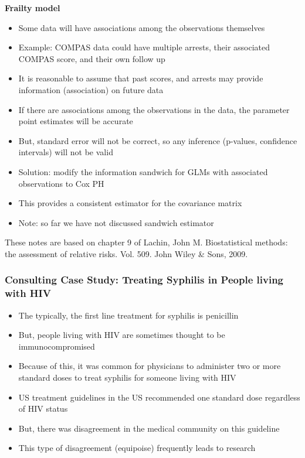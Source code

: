 \documentclass[
]{article}
\providecommand{\tightlist}{%
  \setlength{\itemsep}{0pt}\setlength{\parskip}{0pt}}
\begin{document}
\textbf{Frailty model}

\begin{itemize}
\tightlist
\item
  Some data will have associations among the observations themselves
\item
  Example: COMPAS data could have multiple arrests, their associated
  COMPAS score, and their own follow up
\item
  It is reasonable to assume that past scores, and arrests may provide
  information (association) on future data
\item
  If there are associations among the observations in the data, the
  parameter point estimates will be accurate
\item
  But, standard error will not be correct, so any inference (p-values,
  confidence intervals) will not be valid
\item
  Solution: modify the information sandwich for GLMs with associated
  observations to Cox PH
\item
  This provides a consistent estimator for the covariance matrix
\item
  Note: so far we have not discussed sandwich estimator
\end{itemize}

These notes are based on chapter 9 of Lachin, John M. Biostatistical
methods: the assessment of relative risks. Vol. 509. John Wiley \& Sons,
2009.

\hypertarget{consulting-case-study-treating-syphilis-in-people-living-with-hiv}{%
\subsubsection{Consulting Case Study: Treating Syphilis in People living
with
HIV}\label{consulting-case-study-treating-syphilis-in-people-living-with-hiv}}

\begin{itemize}
\tightlist
\item
  The typically, the first line treatment for syphilis is penicillin
\item
  But, people living with HIV are sometimes thought to be
  immunocompromised
\item
  Because of this, it was common for physicians to administer two or
  more standard doses to treat syphilis for someone living with HIV
\item
  US treatment guidelines in the US recommended one standard dose
  regardless of HIV status
\item
  But, there was disagreement in the medical community on this guideline
\item
  This type of disagreement (equipoise) frequently leads to research
\end{itemize}
\end{document}
